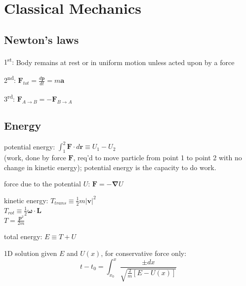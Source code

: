 \documentclass[letterpaper,landscape,10pt]{article}
\newenvironment{mydescription}
{\begin{description}
	\setlength{\itemsep}{0pt}
	\setlength{\parskip}{0pt}
	\setlength{\parsep}{-1pt}}
{\end{description}}
\newenvironment{myitemize}
{\begin{itemize}
	\setlength{\itemsep}{0pt}
	\setlength{\parskip}{0pt}
	\setlength{\parsep}{0pt}}
{\end{itemize}}
\begin{document}
{\begin{multicols}{4}
\begin{myitemize}
	\end{myitemize}

\section*{Classical Mechanics}

	\subsection*{Newton's laws}
		\begin{mydescription}
			\item[1\textsuperscript{st}:]
				Body remains at rest or in uniform motion unless acted upon by
				a force  \\
			\item[2\textsuperscript{nd}:]
				$\bm{F}_{tot} = \frac{d\bm{p}}{dt} = m\bm{a}$	\\
			\item[3\textsuperscript{rd}:]
				$\bm{F}_{A \rightarrow B} = -\bm{F}_{B \rightarrow A}$\\
		\end{mydescription}
	
	\subsection*{Energy}
		\begin{mydescription}
			\item[potential energy:]
				$\displaystyle\int_1^2\bm{F}\cdot d\bm{r} \equiv U_1 - U_2$\\
				(work, done by force $\bm{F}$, req'd to move particle from
				point 1 to point 2 with no change in kinetic energy); potential
				energy is the capacity to do work.  \\
			\item[force due to the potential $U$:]
				$\bm{F} = -\bm{\nabla}U$  \\
			\item[kinetic energy:]
			    $T_{trans} \equiv \frac{1}{2}m|\bm{v}|^2$  \\
				$T_{rot} \equiv \frac{1}{2}\bm{\omega}\cdot\bm{L}$  \\
				$T = \frac{\bm{p}^2}{2m}$  \\
			\item[total energy:]
				$E \equiv T + U$  \\
			\item[1D solution given $E$ and $U(x)$,]
				for conservative force only:\\
				$$
					t-t_0 = \int_{x_0}^x\frac{\pm dx}
					{\sqrt{\frac{2}{m}\left[E-U(x)\right]}}
				$$
		\end{mydescription}


\end{multicols}}
\end{document}
